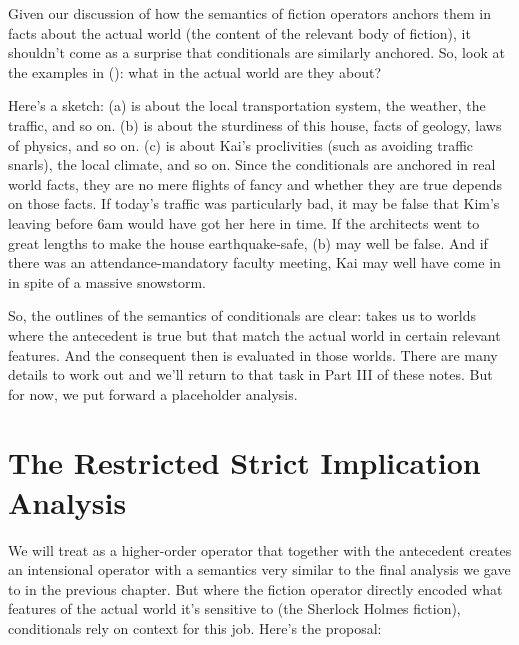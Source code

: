 Given our discussion of how the semantics of fiction operators anchors them in
facts about the actual world (the content of the relevant body of fiction), it
shouldn't come as a surprise that conditionals are similarly anchored. So, look
at the examples in (\lastx): what in the actual world are they about?

%
Here's a sketch: (\lastx a) is about the local transportation system, the
weather, the traffic, and so on. (\lastx b) is about the sturdiness of this
house, facts of geology, laws of physics, and so on. (\lastx c) is about Kai's
proclivities (such as avoiding traffic snarls), the local climate, and so on.
Since the conditionals are anchored in real world facts, they are no mere
flights of fancy and whether they are true depends on those facts. If today's
traffic was particularly bad, it may be false that Kim's leaving before 6am
would have got her here in time. If the architects went to great lengths to make
the house earthquake-safe, (\lastx b) may well be false. And if there was an
attendance-mandatory faculty meeting, Kai may well have come in in spite of a
massive snowstorm.

So, the outlines of the semantics of conditionals are clear: 
takes us to worlds where the antecedent is true but that match the actual world
in certain relevant features. And the consequent then is evaluated in those
worlds. There are many details to work out and we'll return to that task in Part
III of these notes. But for now, we put forward a placeholder analysis.

\section{The Restricted Strict Implication Analysis}

We will treat  as a higher-order operator that together with the
antecedent creates an intensional operator with a semantics very similar to the
final analysis we gave to  in the
previous chapter. But where the fiction operator directly encoded what features
of the actual world it's sensitive to (the Sherlock Holmes fiction),
conditionals rely on context for this job. Here's the proposal:

